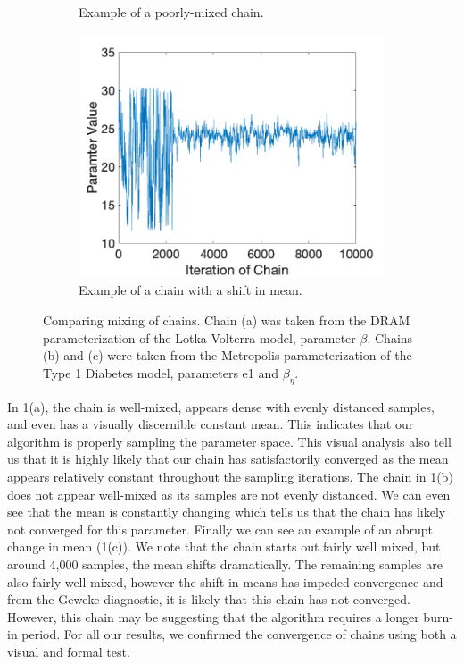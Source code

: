 \documentclass{article}
\begin{document}
\begin{figure}[H]
\begin{subfigure}{.5\textwidth}
  \caption{Example of a poorly-mixed chain.}
  \label{fig:sfig2}
\end{subfigure}
\centering
\begin{subfigure}{.5\textwidth}
  \includegraphics[width=.8\linewidth]{MCMC_figs/chain_mix_ex3.png}
  \caption{Example of a chain with a shift in mean.}
  \label{fig:sfig2}
\end{subfigure}
\caption{Comparing mixing of chains. Chain (a) was taken from the DRAM parameterization of the Lotka-Volterra model, parameter $\beta$. Chains (b) and (c) were taken from the Metropolis parameterization of the Type 1 Diabetes model, parameters e1 and $\beta_\eta$.}
\label{fig:fig}
\end{figure}
In 1(a), the chain is well-mixed, appears dense with evenly distanced samples, and even has a visually discernible constant mean. This indicates that our algorithm is properly sampling the parameter space. This visual analysis also tell us that it is highly likely that our chain has satisfactorily converged as the mean appears relatively constant throughout the sampling iterations. The chain in 1(b) does not appear well-mixed as its samples are not evenly distanced. We can even see that the mean is constantly changing which tells us that the chain has likely not converged for this parameter. Finally we can see an example of an abrupt change in mean (1(c)). We note that the chain starts out fairly well mixed, but around 4,000 samples, the mean shifts dramatically. The remaining samples are also fairly well-mixed, however the shift in means has impeded convergence and from the Geweke diagnostic, it is likely that this chain has not converged. However, this chain may be suggesting that the algorithm requires a longer burn-in period. For all our results, we confirmed the convergence of chains using both a visual and formal test.\vspace{4 mm}
\end{document}
